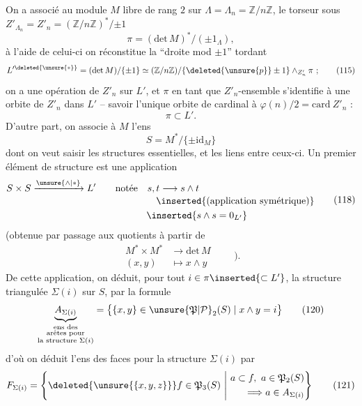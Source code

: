 On a associé au module $M$ libre de rang $2$ sur $\Lambda=\Lambda_n=\mathbb Z/n\mathbb Z$, le torseur sous $Z'_{\Lambda_n}=Z'_n=(\mathbb Z/n\mathbb Z)^*/{\pm1}$\deleted{\unsure{,}}
\[
\pi=(\mathrm{det}\,M)^*/(\pm1_\Lambda),\tag*{(114)}
\]
à l'aide de celui-ci on réconstitue la ``droite mod $\pm1$''  tordant
\[
L^{\prime\deleted{\unsure{*}}}=(\mathrm{det}\,M)/\{\pm1\}\simeq(\mathbb Z/n\mathbb Z)/\{\deleted{\unsure{p}}\pm1\}\mathbin{\wedge}_{Z'_n}\pi\ ;\tag*{(115)}
\]
on a une opération de $Z'_n$ sur $L'$, et $\pi$ en tant que $Z'_n$-ensemble s'identifie à une  orbite de $Z'_n$ dans $L'$ -- savoir  l'unique orbite de cardinal  à $\varphi(n)/2=\mathrm{card}\ Z'_n$ :
\[
\pi\subset L'.\tag*{(116)}
\]
D'autre part, on associe à $M$ l'ens
\[
S=M^*/\{\pm\mathrm{id}_M\}\tag*{(117)}
\]
dont on veut saisir les structures essentielles, et les liens entre ceux-ci.
Un premier élément de structure est une application
\[
\begin{aligned}
S\times S&\xrightarrow{\unsure{\wedge|*}}L'\qquad \text{notée}\quad s,t\longrightarrow s\wedge t\\[-2pt]
&\hspace{13em}\inserted{\text{(application symétrique)}}\\
&\hspace{12em}\inserted{s\wedge s=0_{L'}}
\end{aligned}\tag*{(118)}
\]
(obtenue par passage aux quotients à partir de
\[
\begin{aligned}
M^*\times M^*&\longrightarrow\mathrm{det}\,M\\
(x,y)&\longmapsto x\wedge y
\end{aligned}\qquad).\tag*{(119)}
\]
De cette application, on déduit,  pour tout $i\in\pi\inserted{\subset L'}$, la structure triangulée $\Sigma(i)$ sur $S$, par la formule
\[
\underbrace{A_{\Sigma(i)}}_{\substack{\text{ens des}\\\text{arêtes pour}\\\text{la structure }\Sigma(i)}}=
\bigl\{\{x,y\}\in\unsure{\mathfrak P|\mathcal P}_2(S)\mid x\wedge y=i\bigr\}\tag*{(120)}
\]
d'où on déduit l'ens des faces pour la structure $\Sigma(i)$ par
\[
F_{\Sigma(i)}=\left\{\deleted{\unsure{\{x,y,z\}}} f\in\mathfrak P_3(S)\ \middle|\ 
\begin{aligned}a\subset f,\ a\in\mathfrak P_2(S)\\ \Longrightarrow a\in A_{\Sigma(i)}\end{aligned}\right\}\tag*{(121)}
\]
